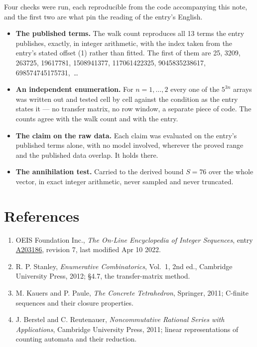 \documentclass[11pt]{article}
\theoremstyle{definition}
\begin{document}
Four checks were run, each reproducible from the code accompanying this note, and the first two are what pin the reading of the entry's English.

\begin{itemize}

\item {\bfseries The published terms.} The walk count reproduces all 13 terms the entry publishes, exactly, in integer arithmetic, with the index taken from the entry's stated offset (1) rather than fitted. The first of them are 25, 3209, 263725, 19617781, 1508941377, 117061422325, 9045835238617, 698574745175731,~\dots

\item {\bfseries An independent enumeration.} For $n = 1,\dots,2$ every one of the $5^{3n}$ arrays was written out and tested cell by cell against the condition as the entry states it --- no transfer matrix, no row window, a separate piece of code. The counts agree with the walk count and with the entry.

\item {\bfseries The claim on the raw data.} Each claim was evaluated on the entry's published terms alone, with no model involved, wherever the proved range and the published data overlap. It holds there.

\item {\bfseries The annihilation test.} Carried to the derived bound $S = 76$ over the whole vector, in exact integer arithmetic, never sampled and never truncated.

\end{itemize}

\section{References}

\begin{enumerate}

\item OEIS Foundation Inc., \emph{The On-Line Encyclopedia of Integer Sequences}, entry \href{https://oeis.org/A203186}{A203186}, revision 7, last modified Apr 10 2022.

\item R. P. Stanley, \emph{Enumerative Combinatorics}, Vol.~1, 2nd ed., Cambridge University Press, 2012; \S4.7, the transfer-matrix method.

\item M. Kauers and P. Paule, \emph{The Concrete Tetrahedron}, Springer, 2011; C-finite sequences and their closure properties.

\item J. Berstel and C. Reutenauer, \emph{Noncommutative Rational Series with Applications}, Cambridge University Press, 2011; linear representations of counting automata and their reduction.

\end{enumerate}
\end{document}
